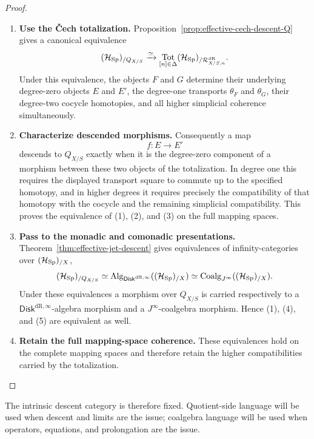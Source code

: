 \begin{proof}
\leavevmode
\begin{enumerate}[label=\textup{(\arabic*)}]
    \item \textbf{Use the Čech totalization.}
Proposition~\ref{prop:effective-cech-descent-Q} gives a canonical equivalence
\[
  (\mathcal H_{\operatorname{Sp}})_{/Q_{X/S}}
  \xrightarrow{\simeq}
  \operatorname*{Tot}_{[n]\in\Delta}
  (\mathcal H_{\operatorname{Sp}})_{/\mathcal R^{\mathrm{dR}}_{X/S,n}}.
\]
Under this equivalence, the objects \(F\) and \(G\) determine their underlying
degree-zero objects \(E\) and \(E'\), the degree-one transports
\(\theta_F\) and \(\theta_G\), their degree-two cocycle homotopies, and all
higher simplicial coherence simultaneously.

    \item \textbf{Characterize descended morphisms.}
Consequently a map
\[
  f:E\to E'
\]
descends to \(Q_{X/S}\) exactly when it is the degree-zero component of a morphism
between these two objects of the totalization. In degree one this requires the
displayed transport square to commute up to the specified homotopy, and in
higher degrees it requires precisely the compatibility of that homotopy with
the cocycle and the remaining simplicial compatibility. This proves the equivalence
of \textup{(1)}, \textup{(2)}, and \textup{(3)} on the full mapping spaces.

    \item \textbf{Pass to the monadic and comonadic presentations.}
Theorem~\ref{thm:effective-jet-descent} gives equivalences of
infinity-categories over \((\mathcal H_{\operatorname{Sp}})_{/X}\),
\[
  (\mathcal H_{\operatorname{Sp}})_{/Q_{X/S}}
  \simeq
  \operatorname{Alg}_{\mathsf{Disk}^{\mathrm{dR},\infty}}((\mathcal H_{\operatorname{Sp}})_{/X})
  \simeq
  \operatorname{Coalg}_{J^\infty}((\mathcal H_{\operatorname{Sp}})_{/X}).
\]
Under these equivalences a morphism over \(Q_{X/S}\) is carried respectively to a
\(\mathsf{Disk}^{\mathrm{dR},\infty}\)-algebra morphism and a \(J^\infty\)-coalgebra morphism. Hence
\textup{(1)}, \textup{(4)}, and \textup{(5)} are equivalent as well.

    \item \textbf{Retain the full mapping-space coherence.}
These equivalences hold on the complete mapping spaces and therefore retain
the higher compatibilities carried by the totalization.
\end{enumerate}
\end{proof}

The intrinsic descent category is therefore fixed. Quotient-side language will
be used when descent and limits are the issue; coalgebra language will be used
when operators, equations, and prolongation are the issue.

